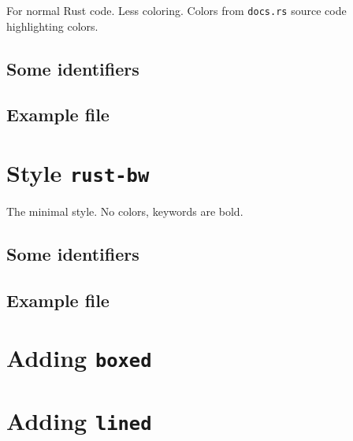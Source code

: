 \documentclass[DIV13]{scrartcl}
\begin{document}
For normal Rust code. Less coloring. Colors from \texttt{docs.rs} source code
highlighting colors.

\subsection*{Some identifiers}


\clearpage
\subsection*{Example file}



\clearpage
\section*{Style \texttt{rust-bw}}

The minimal style. No colors, keywords are bold.

\subsection*{Some identifiers}


\clearpage
\subsection*{Example file}



\clearpage
\section*{Adding \texttt{boxed}}



\clearpage
\section*{Adding \texttt{lined}}

\end{document}
